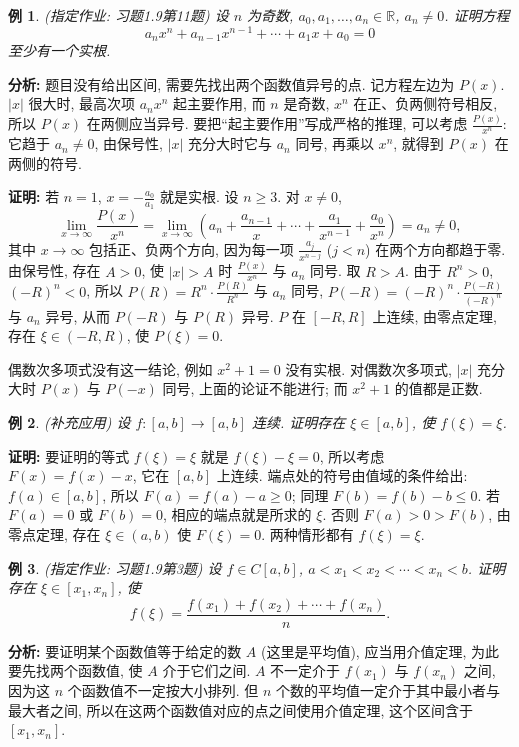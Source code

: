\documentclass[UTF8,openany]{ctexbook}
\theoremstyle{chinesetextbook}
\newtheorem{example}{例}[section]
\newenvironment{cnproof}{\par\indent\textbf{证明:} \ignorespaces}{\par}
\begin{document}
\begin{example}
\textnormal{(指定作业: 习题1.9第11题)} 设 $n$ 为奇数, $a_0,a_1,\ldots,a_n\in\mathbb R$, $a_n\ne0$. 证明方程
\[
a_nx^n+a_{n-1}x^{n-1}+\cdots+a_1x+a_0=0
\]
至少有一个实根.
\end{example}
\par\indent\textbf{分析:} 题目没有给出区间, 需要先找出两个函数值异号的点. 记方程左边为 $P(x)$. $|x|$ 很大时, 最高次项 $a_nx^n$ 起主要作用, 而 $n$ 是奇数, $x^n$ 在正、负两侧符号相反, 所以 $P(x)$ 在两侧应当异号. 要把“起主要作用”写成严格的推理, 可以考虑 $\displaystyle\frac{P(x)}{x^n}$: 它趋于 $a_n\ne0$, 由保号性, $|x|$ 充分大时它与 $a_n$ 同号, 再乘以 $x^n$, 就得到 $P(x)$ 在两侧的符号.
\begin{cnproof}
若 $n=1$, $\displaystyle x=-\frac{a_0}{a_1}$ 就是实根. 设 $n\ge3$. 对 $x\ne0$,
\[
\lim_{x\to\infty}\frac{P(x)}{x^n}=\lim_{x\to\infty}\left(a_n+\frac{a_{n-1}}x+\cdots+\frac{a_1}{x^{n-1}}+\frac{a_0}{x^n}\right)=a_n\ne0,
\]
其中 $x\to\infty$ 包括正、负两个方向, 因为每一项 $\displaystyle\frac{a_j}{x^{n-j}}$ ($j<n$) 在两个方向都趋于零. 由保号性, 存在 $A>0$, 使 $|x|>A$ 时 $\displaystyle\frac{P(x)}{x^n}$ 与 $a_n$ 同号. 取 $R>A$. 由于 $R^n>0$, $(-R)^n<0$, 所以 $\displaystyle P(R)=R^n\cdot\frac{P(R)}{R^n}$ 与 $a_n$ 同号, $\displaystyle P(-R)=(-R)^n\cdot\frac{P(-R)}{(-R)^n}$ 与 $a_n$ 异号, 从而 $P(-R)$ 与 $P(R)$ 异号. $P$ 在 $[-R,R]$ 上连续, 由零点定理, 存在 $\xi\in(-R,R)$, 使 $P(\xi)=0$.
\end{cnproof}
偶数次多项式没有这一结论, 例如 $x^2+1=0$ 没有实根. 对偶数次多项式, $|x|$ 充分大时 $P(x)$ 与 $P(-x)$ 同号, 上面的论证不能进行; 而 $x^2+1$ 的值都是正数.
\begin{example}
\textnormal{(补充应用)} 设 $f:[a,b]\to[a,b]$ 连续. 证明存在 $\xi\in[a,b]$, 使 $f(\xi)=\xi$.
\end{example}
\begin{cnproof}
要证明的等式 $f(\xi)=\xi$ 就是 $f(\xi)-\xi=0$, 所以考虑 $F(x)=f(x)-x$, 它在 $[a,b]$ 上连续. 端点处的符号由值域的条件给出: $f(a)\in[a,b]$, 所以 $F(a)=f(a)-a\ge0$; 同理 $F(b)=f(b)-b\le0$. 若 $F(a)=0$ 或 $F(b)=0$, 相应的端点就是所求的 $\xi$. 否则 $F(a)>0>F(b)$, 由零点定理, 存在 $\xi\in(a,b)$ 使 $F(\xi)=0$. 两种情形都有 $f(\xi)=\xi$.
\end{cnproof}
\begin{example}
\textnormal{(指定作业: 习题1.9第3题)} 设 $f\in C[a,b]$, $a<x_1<x_2<\cdots<x_n<b$. 证明存在 $\xi\in[x_1,x_n]$, 使
\[
f(\xi)=\frac{f(x_1)+f(x_2)+\cdots+f(x_n)}n.
\]
\end{example}
\par\indent\textbf{分析:} 要证明某个函数值等于给定的数 $A$ (这里是平均值), 应当用介值定理, 为此要先找两个函数值, 使 $A$ 介于它们之间. $A$ 不一定介于 $f(x_1)$ 与 $f(x_n)$ 之间, 因为这 $n$ 个函数值不一定按大小排列. 但 $n$ 个数的平均值一定介于其中最小者与最大者之间, 所以在这两个函数值对应的点之间使用介值定理, 这个区间含于 $[x_1,x_n]$.
\end{document}
